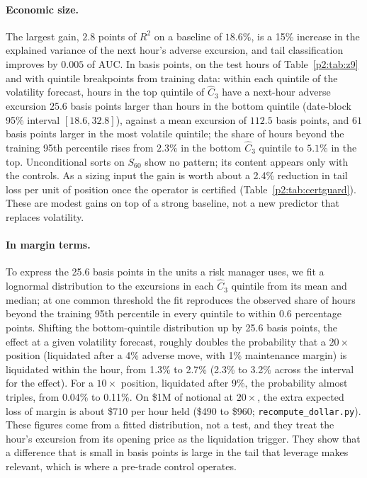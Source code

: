 \paragraph{Economic size.} The largest gain, $2.8$ points of $R^2$ on a baseline of $18.6\%$, is a 15\% increase in the explained variance of the next hour's adverse excursion, and tail classification improves by $0.005$ of AUC. In basis points, on the test hours of Table~\ref{p2:tab:z9} and with quintile breakpoints from training data: within each quintile of the volatility forecast, hours in the top quintile of $\hat C_3$ have a next-hour adverse excursion $25.6$ basis points larger than hours in the bottom quintile (date-block 95\% interval $[18.6,32.8]$), against a mean excursion of $112.5$ basis points, and $61$ basis points larger in the most volatile quintile; the share of hours beyond the training 95th percentile rises from $2.3\%$ in the bottom $\hat C_3$ quintile to $5.1\%$ in the top. Unconditional sorts on $S_{60}$ show no pattern; its content appears only with the controls. As a sizing input the gain is worth about a 2.4\% reduction in tail loss per unit of position once the operator is certified (Table~\ref{p2:tab:certguard}). These are modest gains on top of a strong baseline, not a new predictor that replaces volatility.

\paragraph{In margin terms.} To express the 25.6 basis points in the units a risk manager uses, we fit a lognormal distribution to the excursions in each $\hat C_3$ quintile from its mean and median; at one common threshold the fit reproduces the observed share of hours beyond the training 95th percentile in every quintile to within 0.6 percentage points. Shifting the bottom-quintile distribution up by 25.6 basis points, the effect at a given volatility forecast, roughly doubles the probability that a $20\times$ position (liquidated after a 4\% adverse move, with 1\% maintenance margin) is liquidated within the hour, from 1.3\% to 2.7\% (2.3\% to 3.2\% across the interval for the effect). For a $10\times$ position, liquidated after 9\%, the probability almost triples, from 0.04\% to 0.11\%. On \$1M of notional at $20\times$, the extra expected loss of margin is about \$710 per hour held (\$490 to \$960; \texttt{recompute\_dollar.py}). These figures come from a fitted distribution, not a test, and they treat the hour's excursion from its opening price as the liquidation trigger. They show that a difference that is small in basis points is large in the tail that leverage makes relevant, which is where a pre-trade control operates.

